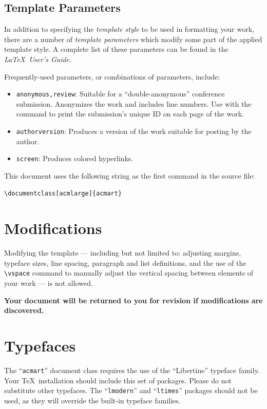 \documentclass[acmlarge]{acmart}
\begin{document}
\subsection{Template Parameters}

In addition to specifying the {\itshape template style} to be used in
formatting your work, there are a number of {\itshape template parameters}
which modify some part of the applied template style. A complete list
of these parameters can be found in the {\itshape \LaTeX\ User's Guide.}

Frequently-used parameters, or combinations of parameters, include:
\begin{itemize}
\item {\texttt{anonymous,review}}: Suitable for a ``double-anonymous''
  conference submission. Anonymizes the work and includes line
  numbers. Use with the \texttt{\string\acmSubmissionID} command to print the
  submission's unique ID on each page of the work.
\item{\texttt{authorversion}}: Produces a version of the work suitable
  for posting by the author.
\item{\texttt{screen}}: Produces colored hyperlinks.
\end{itemize}

This document uses the following string as the first command in the
source file:
\begin{verbatim}
\documentclass[acmlarge]{acmart}
\end{verbatim}

\section{Modifications}

Modifying the template --- including but not limited to: adjusting
margins, typeface sizes, line spacing, paragraph and list definitions,
and the use of the \verb|\vspace| command to manually adjust the
vertical spacing between elements of your work --- is not allowed.

{\bfseries Your document will be returned to you for revision if
  modifications are discovered.}

\section{Typefaces}

The ``\verb|acmart|'' document class requires the use of the
``Libertine'' typeface family. Your \TeX\ installation should include
this set of packages. Please do not substitute other typefaces. The
``\verb|lmodern|'' and ``\verb|ltimes|'' packages should not be used,
as they will override the built-in typeface families.
\end{document}
